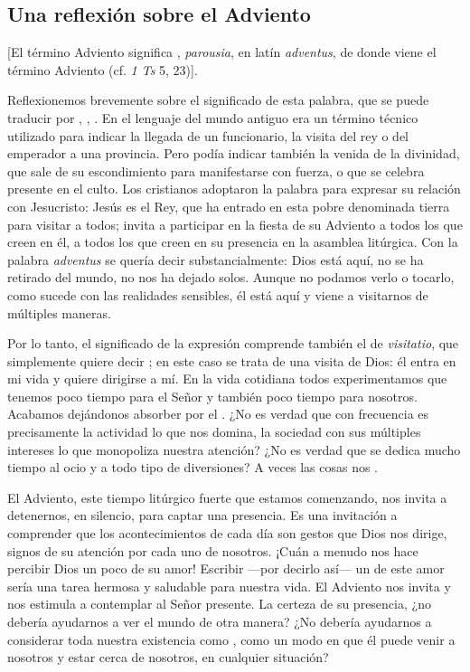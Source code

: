 \begin{introstyle}
	\section{Una reflexión sobre el Adviento}
	
	{[}El término Adviento significa , \emph{parousia}, en latín \emph{adventus}, de donde viene el término Adviento (cf. \emph{1 Ts} 5, 23){]}.
	
	Reflexionemos brevemente sobre el significado de esta palabra, que se puede traducir por , , . En el lenguaje del mundo antiguo era un término técnico utilizado para indicar la llegada de un funcionario, la visita del rey o del emperador a una provincia. Pero podía indicar también la venida de la divinidad, que sale de su escondimiento para manifestarse con fuerza, o que se celebra presente en el culto. Los cristianos adoptaron la palabra  para expresar su relación con Jesucristo: Jesús es el Rey, que ha entrado en esta pobre  denominada tierra para visitar a todos; invita a participar en la fiesta de su Adviento a todos los que creen en él, a todos los que creen en su presencia en la asamblea litúrgica. Con la palabra \emph{adventus} se quería decir substancialmente: Dios está aquí, no se ha retirado del mundo, no nos ha dejado solos. Aunque no podamos verlo o tocarlo, como sucede con las realidades sensibles, él está aquí y viene a visitarnos de múltiples maneras.
	
	Por lo tanto, el significado de la expresión  comprende también el de \emph{visitatio}, que simplemente quiere decir ; en este caso se trata de una visita de Dios: él entra en mi vida y quiere dirigirse a mí. En la vida cotidiana todos experimentamos que tenemos poco tiempo para el Señor y también poco tiempo para nosotros. Acabamos dejándonos absorber por el . ¿No es verdad que con frecuencia es precisamente la actividad lo que nos domina, la sociedad con sus múltiples intereses lo que monopoliza nuestra atención? ¿No es verdad que se dedica mucho tiempo al ocio y a todo tipo de diversiones? A veces las cosas nos .
	
	El Adviento, este tiempo litúrgico fuerte que estamos comenzando, nos invita a detenernos, en silencio, para captar una presencia. Es una invitación a comprender que los acontecimientos de cada día son gestos que Dios nos dirige, signos de su atención por cada uno de nosotros. ¡Cuán a menudo nos hace percibir Dios un poco de su amor! Escribir ---por decirlo así--- un  de este amor sería una tarea hermosa y saludable para nuestra vida. El Adviento nos invita y nos estimula a contemplar al Señor presente. La certeza de su presencia, ¿no debería ayudarnos a ver el mundo de otra manera? ¿No debería ayudarnos a considerar toda nuestra existencia como , como un modo en que él puede venir a nosotros y estar cerca de nosotros, en cualquier situación?
	

\end{introstyle}
